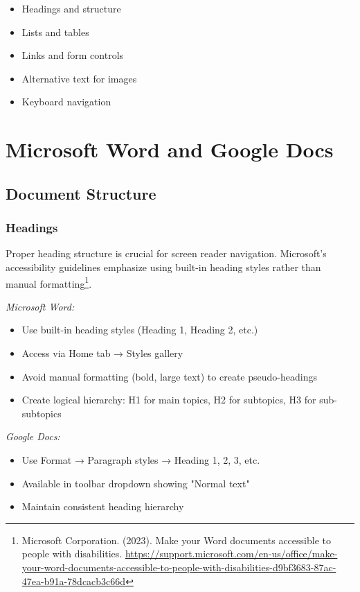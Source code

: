 \begin{itemize}
\item Headings and structure
\item Lists and tables
\item Links and form controls
\item Alternative text for images
\item Keyboard navigation
\end{itemize}

\section{Microsoft Word and Google Docs}
\label{sec:word-google-docs}

\subsection{Document Structure}

\subsubsection{Headings}
Proper heading structure is crucial for screen reader navigation. Microsoft's accessibility guidelines emphasize using built-in heading styles rather than manual formatting\footnote{Microsoft Corporation. (2023). Make your Word documents accessible to people with disabilities. \url{https://support.microsoft.com/en-us/office/make-your-word-documents-accessible-to-people-with-disabilities-d9bf3683-87ac-47ea-b91a-78dcacb3c66d}}.

\emph{Microsoft Word:}
\begin{itemize}
\item Use built-in heading styles (Heading 1, Heading 2, etc.)
\item Access via Home tab → Styles gallery
\item Avoid manual formatting (bold, large text) to create pseudo-headings
\item Create logical hierarchy: H1 for main topics, H2 for subtopics, H3 for sub-subtopics
\end{itemize}

\emph{Google Docs:}
\begin{itemize}
\item Use Format → Paragraph styles → Heading 1, 2, 3, etc.
\item Available in toolbar dropdown showing "Normal text"
\item Maintain consistent heading hierarchy
\end{itemize}


